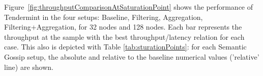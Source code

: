 Figure~\ref{fig:throughputComparisonAtSaturationPoint} shows the performance of Tendermint
in the four setups:  Baseline, Filtering, Aggregation, Filtering+Aggregation, for 32 nodes and 128 nodes.
Each bar represents the throughput at the sample with the best throughput/latency relation for each case.
This also is depicted with Table \ref{tab:sturationPoints}: for each Semantic Gossip setup,
the absolute and relative to the baseline numerical values ('relative' line) are shown.



%
%
%


